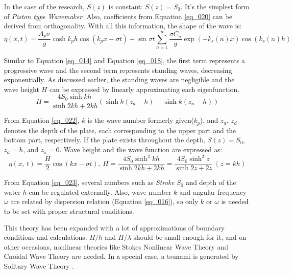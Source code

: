 In the case of the research, $S(z)$ is constant: $S(z) = S_0$. It's the simplest form of \textit{Piston type Wavemaker}. Also, coefficients from Equation \ref{eq_020} can be derived from orthogonality. With all this information, the shape of the wave is:
\begin{equation}
    \eta(x, t) = \frac{A_p \sigma}{g}\cosh{k_p h} \cos{(k_p x - \sigma t)} + \sin{\sigma t} \sum_{n=1}^{\infty} \frac{\sigma C_n}{g} \exp{(-k_s (n) x)} \cos{(k_s (n) h)}
    \label{eq_021}
\end{equation}

Similar to Equation \ref{eq_014} and Equation \ref{eq_018}, the first term represents a progressive wave and the second term represents standing waves, decreasing exponentially. As discussed earlier, the standing waves are negligible and the wave height $H$ can be expressed by linearly approximating each eigenfunction.
\begin{equation}
        H = \frac{4 S_0 \sinh{kh}}{\sinh{2kh} + 2kh}(\sinh{k(z_d - h)} - \sinh{k(z_u - h)})\label{eq_022}
\end{equation}

From Equation \ref{eq_022}, $k$ is the wave number formerly given($k_p$), and $z_u$, $z_d$ denotes the depth of the plate, each corresponding to the upper part and the bottom part, respectively. If the plate exists throughout the depth, $S(z) = S_0$, $z_d = h$, and $z_u = 0$. Wave height and the wave function are expressed as:
\begin{equation}
    \eta(x, ~t) = \frac{H}{2} \cos{(kx-\sigma t)}, ~H = \frac{4 S_0 \sinh^2 {kh}}{\sinh{2kh} + 2kh} = \frac{4 S_0 \sinh^2 {z}}{\sinh{2z} + 2z}~(z=kh)
    \label{eq_023}
\end{equation}

From Equation \ref{eq_023}, several numbers such as \emph{Stroke} $S_0$ and depth of the water $h$ can be regulated externally. Also, wave number $k$ and angular frequency $\omega$ are related by dispersion relation (Equation \ref{eq_016}), so only $k$ or $\omega$ is needed to be set with proper structural conditions.

This theory has been expanded with a lot of approximations of boundary conditions and calculations. $H/h$ and $H/\lambda$ should be small enough for it, and on other occasions, nonlinear theories like Stokes Nonlinear Wave Theory and Cnoidal Wave Theory are needed. In a special case, a tsunami is generated by Solitary Wave Theory \cite{madsen1970waves, watts1998wavemaker, fenton1990nonlinear}.

